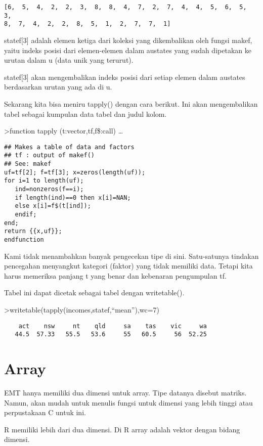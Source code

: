 \documentclass[
]{book}
\begin{document}
\begin{verbatim}
[6,  5,  4,  2,  2,  3,  8,  8,  4,  7,  2,  7,  4,  4,  5,  6,  5,  3,
8,  7,  4,  2,  2,  8,  5,  1,  2,  7,  7,  1]
\end{verbatim}

statef{[}3{]} adalah elemen ketiga dari koleksi yang dikembalikan oleh fungsi makef, yaitu indeks posisi dari elemen-elemen dalam austates yang sudah dipetakan ke urutan dalam u (data unik yang terurut).

statef{[}3{]} akan mengembalikan indeks posisi dari setiap elemen dalam austates berdasarkan urutan yang ada di u.

Sekarang kita bisa meniru tapply() dengan cara berikut. Ini akan mengembalikan tabel sebagai kumpulan data tabel dan judul kolom.

\textgreater function tapply (t:vector,tf,f\$:call) \ldots{}

\begin{verbatim}
## Makes a table of data and factors
## tf : output of makef()
## See: makef
uf=tf[2]; f=tf[3]; x=zeros(length(uf));
for i=1 to length(uf);
   ind=nonzeros(f==i);
   if length(ind)==0 then x[i]=NAN;
   else x[i]=f$(t[ind]);
   endif;
end;
return {{x,uf}};
endfunction
\end{verbatim}

Kami tidak menambahkan banyak pengecekan tipe di sini. Satu-satunya tindakan pencegahan menyangkut kategori (faktor) yang tidak memiliki data. Tetapi kita harus memeriksa panjang t yang benar dan kebenaran pengumpulan tf.

Tabel ini dapat dicetak sebagai tabel dengan writetable().

\textgreater writetable(tapply(incomes,statef,``mean''),wc=7)

\begin{verbatim}
    act    nsw     nt    qld     sa    tas    vic     wa
   44.5  57.33   55.5   53.6     55   60.5     56  52.25
\end{verbatim}

\chapter{Array}\label{array}

EMT hanya memiliki dua dimensi untuk array. Tipe datanya disebut matriks. Namun, akan mudah untuk menulis fungsi untuk dimensi yang lebih tinggi atau perpustakaan C untuk ini.

R memiliki lebih dari dua dimensi. Di R array adalah vektor dengan bidang dimensi.
\end{document}
